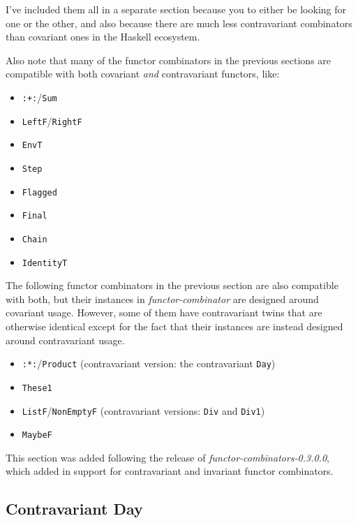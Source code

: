 \documentclass[]{article}
\begin{document}
I've included them all in a separate section because you to either be looking
for one or the other, and also because there are much less contravariant
combinators than covariant ones in the Haskell ecosystem.

Also note that many of the functor combinators in the previous sections are
compatible with both covariant \emph{and} contravariant functors, like:

\begin{itemize}
\tightlist
\item
  \texttt{:+:}/\texttt{Sum}
\item
  \texttt{LeftF}/\texttt{RightF}
\item
  \texttt{EnvT}
\item
  \texttt{Step}
\item
  \texttt{Flagged}
\item
  \texttt{Final}
\item
  \texttt{Chain}
\item
  \texttt{IdentityT}
\end{itemize}

The following functor combinators in the previous section are also compatible
with both, but their instances in \emph{functor-combinator} are designed around
covariant usage. However, some of them have contravariant twins that are
otherwise identical except for the fact that their instances are instead
designed around contravariant usage.

\begin{itemize}
\tightlist
\item
  \texttt{:*:}/\texttt{Product} (contravariant version: the contravariant
  \texttt{Day})
\item
  \texttt{These1}
\item
  \texttt{ListF}/\texttt{NonEmptyF} (contravariant versions: \texttt{Div} and
  \texttt{Div1})
\item
  \texttt{MaybeF}
\end{itemize}

This section was added following the release of
\emph{functor-combinators-0.3.0.0}, which added in support for contravariant and
invariant functor combinators.

\hypertarget{contravariant-day}{%
\subsection{Contravariant Day}\label{contravariant-day}}
\end{document}
